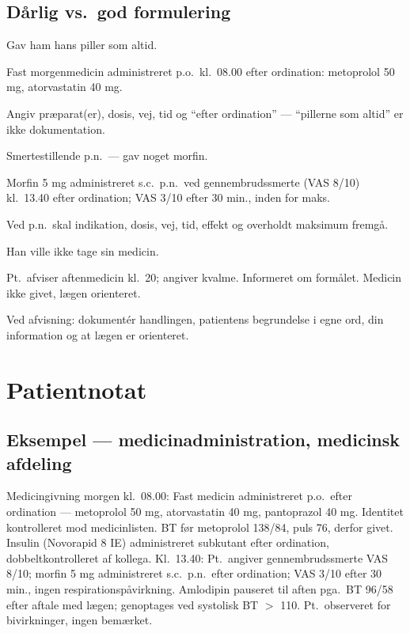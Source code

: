\documentclass[11pt,a4paper]{report}
\begin{document}
\subsection{Dårlig vs.\ god formulering}
\begin{daarligbox}Gav ham hans piller som altid.\end{daarligbox}
\begin{godbox}Fast morgenmedicin administreret p.o.\ kl.\ 08.00 efter ordination: metoprolol 50 mg, atorvastatin 40 mg.\end{godbox}
\begin{hvorforbox}Angiv præparat(er), dosis, vej, tid og ``efter ordination'' --- ``pillerne som altid'' er ikke dokumentation.\end{hvorforbox}
\medskip
\begin{daarligbox}Smertestillende p.n.\ --- gav noget morfin.\end{daarligbox}
\begin{godbox}Morfin 5 mg administreret s.c.\ p.n.\ ved gennembrudssmerte (VAS 8/10) kl.\ 13.40 efter ordination; VAS 3/10 efter 30 min., inden for maks.\end{godbox}
\begin{hvorforbox}Ved p.n.\ skal indikation, dosis, vej, tid, effekt og overholdt maksimum fremgå.\end{hvorforbox}
\medskip
\begin{daarligbox}Han ville ikke tage sin medicin.\end{daarligbox}
\begin{godbox}Pt.\ afviser aftenmedicin kl.\ 20; angiver kvalme. Informeret om formålet. Medicin ikke givet, lægen orienteret.\end{godbox}
\begin{hvorforbox}Ved afvisning: dokumentér handlingen, patientens begrundelse i egne ord, din information og at lægen er orienteret.\end{hvorforbox}

\section{Patientnotat}
\subsection{Eksempel --- medicinadministration, medicinsk afdeling}
\begin{notebox}
Medicingivning morgen kl.\ 08.00: Fast medicin administreret p.o.\ efter ordination --- metoprolol
50 mg, atorvastatin 40 mg, pantoprazol 40 mg. Identitet kontrolleret mod medicinlisten. BT før
metoprolol 138/84, puls 76, derfor givet. Insulin (Novorapid 8 IE) administreret subkutant efter
ordination, dobbeltkontrolleret af kollega. Kl.\ 13.40: Pt.\ angiver gennembrudssmerte VAS 8/10;
morfin 5 mg administreret s.c.\ p.n.\ efter ordination; VAS 3/10 efter 30 min., ingen
respirationspåvirkning. Amlodipin pauseret til aften pga.\ BT 96/58 efter aftale med lægen;
genoptages ved systolisk BT $>$ 110. Pt.\ observeret for bivirkninger, ingen bemærket.
\end{notebox}
\end{document}
